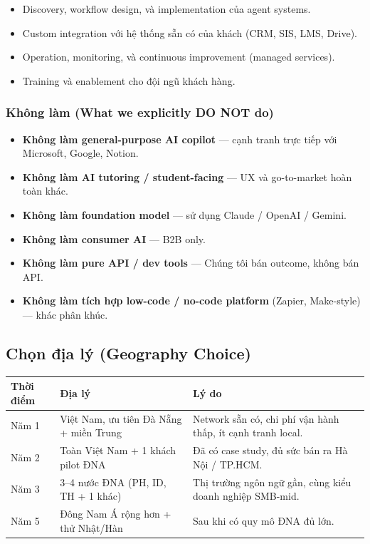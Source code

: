 \documentclass[11pt,a4paper]{article}
\begin{document}
\begin{itemize}
\item Discovery, workflow design, và implementation của agent systems.
\item Custom integration với hệ thống sẵn có của khách (CRM, SIS, LMS, Drive).
\item Operation, monitoring, và continuous improvement (managed services).
\item Training và enablement cho đội ngũ khách hàng.
\end{itemize}

\subsubsection*{Không làm (What we explicitly DO NOT do)}

\begin{itemize}
\item \textbf{Không làm general-purpose AI copilot} --- cạnh tranh trực tiếp với Microsoft, Google, Notion.
\item \textbf{Không làm AI tutoring / student-facing} --- UX và go-to-market hoàn toàn khác.
\item \textbf{Không làm foundation model} --- sử dụng Claude / OpenAI / Gemini.
\item \textbf{Không làm consumer AI} --- B2B only.
\item \textbf{Không làm pure API / dev tools} --- Chúng tôi bán outcome, không bán API.
\item \textbf{Không làm tích hợp low-code / no-code platform} (Zapier, Make-style) --- khác phân khúc.
\end{itemize}

\subsection{Chọn địa lý (Geography Choice)}

\begin{tabularx}{\linewidth}{@{}p{2cm} X p{3.5cm}@{}}
\toprule
\textbf{Thời điểm} & \textbf{Địa lý} & \textbf{Lý do} \\
\midrule
Năm 1 & Việt Nam, ưu tiên Đà Nẵng + miền Trung & Network sẵn có, chi phí vận hành thấp, ít cạnh tranh local. \\
Năm 2 & Toàn Việt Nam + 1 khách pilot ĐNA & Đã có case study, đủ sức bán ra Hà Nội / TP.HCM. \\
Năm 3 & 3--4 nước ĐNA (PH, ID, TH + 1 khác) & Thị trường ngôn ngữ gần, cùng kiểu doanh nghiệp SMB-mid. \\
Năm 5 & Đông Nam Á rộng hơn + thử Nhật/Hàn & Sau khi có quy mô ĐNA đủ lớn. \\
\bottomrule
\end{tabularx}
\end{document}
